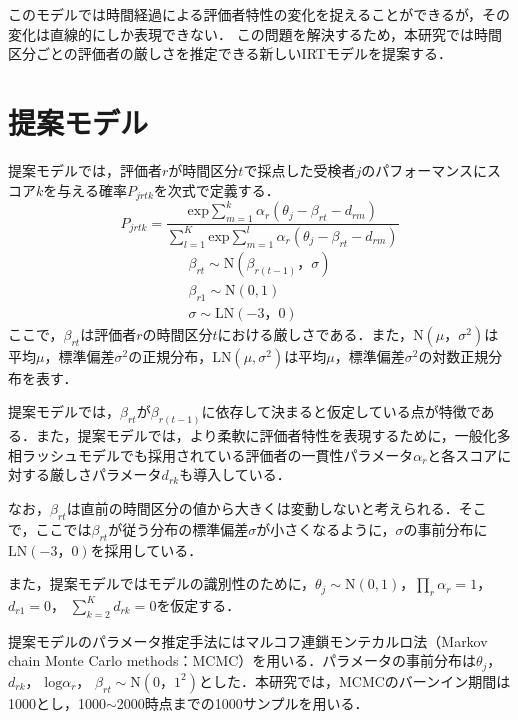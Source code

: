 \documentclass[twocolumn,10pt]{jsarticle}
\begin{document}
このモデルでは時間経過による評価者特性の変化を捉えることができるが，その変化は直線的にしか表現できない．
この問題を解決するため，本研究では時間区分ごとの評価者の厳しさを推定できる新しいIRTモデルを提案する．
\vspace{-2mm}
\section{提案モデル}\label{sec:proposal}
\vspace{-1mm}
提案モデルでは，評価者$r$が時間区分$t$で採点した受検者$j$のパフォーマンスにスコア$k$を与える確率$P_{jrtk}$を次式で定義する．
\begin{equation}
  P_{jrtk}=\frac{\mathrm{exp}\sum^k_{m=1}{\alpha_r(\theta_{j}-\beta_{rt}-d_{rm})}}{\sum^K_{l=1} \mathrm{exp}\sum^l_{m=1}{\alpha_r(\theta_{j}-\beta_{rt}-d_{rm})}}
\end{equation}
\vspace{-5mm}
{\small
\begin{eqnarray}
  \beta_{rt}\sim \mathrm{N}(\beta_{r(t-1)}，\sigma)\nonumber\\
  \beta_{r1} \sim \mathrm{N}(0,1)\nonumber\\
  \sigma \sim \mathrm{LN}(-3，0)\nonumber
\end{eqnarray}
}
ここで，$\beta_{rt}$は評価者$r$の時間区分$t$における厳しさである．また，$\mathrm{N}(\mu，\sigma^2)$は平均$\mu$，標準偏差$\sigma^2$の正規分布，$\mathrm{LN}(\mu,\sigma^2)$は平均$\mu$，標準偏差$\sigma^2$の対数正規分布を表す．

提案モデルでは，$\beta_{rt}$が$\beta_{r(t-1)}$に依存して決まると仮定している点が特徴である．また，提案モデルでは，より柔軟に評価者特性を表現するために，一般化多相ラッシュモデルでも採用されている評価者の一貫性パラメータ$\alpha_r$と各スコアに対する厳しさパラメータ$d_{rk}$も導入している．

なお，$\beta_{rt}$は直前の時間区分の値から大きくは変動しないと考えられる．そこで，ここでは$\beta_{rt}$が従う分布の標準偏差$\sigma$が小さくなるように，$\sigma$の事前分布に$\mathrm{LN}(−3，0)$を採用している．

また，提案モデルではモデルの識別性のために，$\theta_{j}\sim \mathrm{N}(0,1)$，$\prod_{r}\alpha_r=1$， $d_{r1}=0$， $\sum_{k=2}^{K}d_{rk}=0$を仮定する．

提案モデルのパラメータ推定手法にはマルコフ連鎖モンテカルロ法（Markov chain Monte Carlo methods：MCMC）を用いる．パラメータの事前分布は$\theta_{j}$， $d_{rk}$， $\mathrm{log}\alpha_{r}$， $\beta_{rt}\sim \mathrm{N}(0，1^{2})$とした．本研究では，MCMCのバーンイン期間は1000とし，1000$\sim$2000時点までの1000サンプルを用いる．
\vspace{-2mm}
\end{document}
